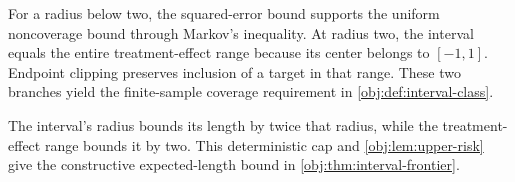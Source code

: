 For a radius below two, the squared-error bound supports the uniform noncoverage bound through Markov's inequality. At radius two, the interval equals the entire treatment-effect range because its center belongs to \([-1,1]\). Endpoint clipping preserves inclusion of a target in that range. These two branches yield the finite-sample coverage requirement in \cref{obj:def:interval-class}.

The interval's radius bounds its length by twice that radius, while the treatment-effect range bounds it by two. This deterministic cap and \cref{obj:lem:upper-risk} give the constructive expected-length bound in \cref{obj:thm:interval-frontier}.
